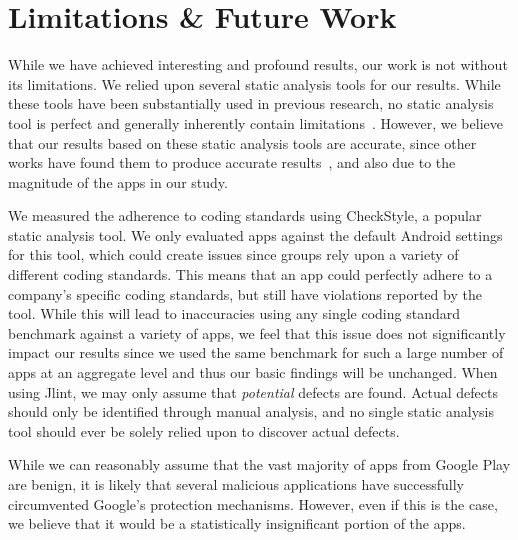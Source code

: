 \documentclass{sig-alternate}
\newcommand{\todo}[1]{\textcolor{cyan}{\textbf{[#1]}}}
\newcommand{\dan}[1]{\textcolor{blue}{{\it [Dan says: #1]}}}
\begin{document}








\section{Limitations \& Future Work}
\label{sec:limitations}

While we have achieved interesting and profound results, our work is not without its limitations. We relied upon several static analysis tools for our results. While these tools have been substantially used in previous research, no static analysis tool is perfect and generally inherently contain limitations~\cite{chess2004static}. However, we believe that our results based on these static analysis tools are accurate, since other works have found them to produce accurate results~\cite{apvrille2012android,chawla2014transfiguring}, and also due to the magnitude of the apps in our study.


We measured the adherence to coding standards using CheckStyle, a popular static analysis tool. We only evaluated apps against the default Android settings for this tool, which could create issues since groups rely upon a variety of different coding standards. This means that an app could perfectly adhere to a company's specific coding standards, but still have violations reported by the tool. While this will lead to inaccuracies using any single coding standard benchmark against a variety of apps, we feel that this issue does not significantly impact our results since we used the same benchmark for such a large number of apps at an aggregate level and thus our basic findings will be unchanged. When using Jlint, we may only assume that \emph{potential} defects are found. Actual defects should only be identified through manual analysis, and no single static analysis tool should ever be solely relied upon to discover actual defects.


While we can reasonably assume that the vast majority of apps from Google Play are benign, it is likely that several malicious applications have successfully circumvented Google's protection mechanisms. However, even if this is the case, we believe that it would be a statistically insignificant portion of the apps.
\end{document}
